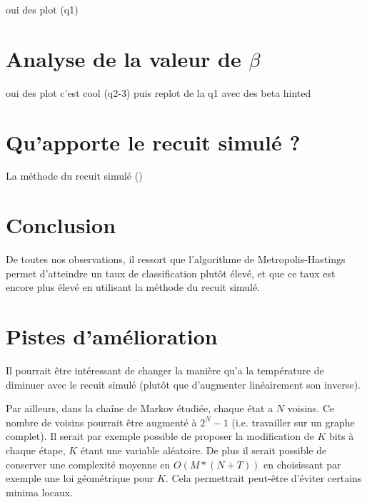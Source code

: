 \documentclass[twocolumn]{article}
\begin{document}
		oui des plot (q1)
	\section{Analyse de la valeur de $\beta$}
		oui des plot c'est cool (q2-3)
		puis replot de la q1 avec des beta hinted
	\section{Qu'apporte le recuit simulé ?}
		La méthode du recuit simulé ()
		
	\section{Conclusion}
		De toutes nos observations, il ressort que l'algorithme de Metropolis-Hastings permet d'atteindre un taux de classification plutôt élevé, et que ce taux est encore plus élevé en utilisant la méthode du recuit simulé.
		
	\section{Pistes d'amélioration}
		Il pourrait être intéressant de changer la manière qu'a la température de diminuer avec le recuit simulé (plutôt que d'augmenter linéairement son inverse).
		
		Par ailleurs, dans la chaîne de Markov étudiée, chaque état a $N$ voisins. Ce nombre de voisins pourrait être augmenté à $2^N-1$ (i.e. travailler sur un graphe complet). Il serait par exemple possible de proposer la modification de $K$ bits à chaque étape, $K$ étant une variable aléatoire. De plus il serait possible de conserver une complexité moyenne en $O(M*(N+T))$ en choisissant par exemple une loi géométrique pour $K$.
		Cela permettrait peut-être d'éviter certains minima locaux.
		
		
\end{document}
